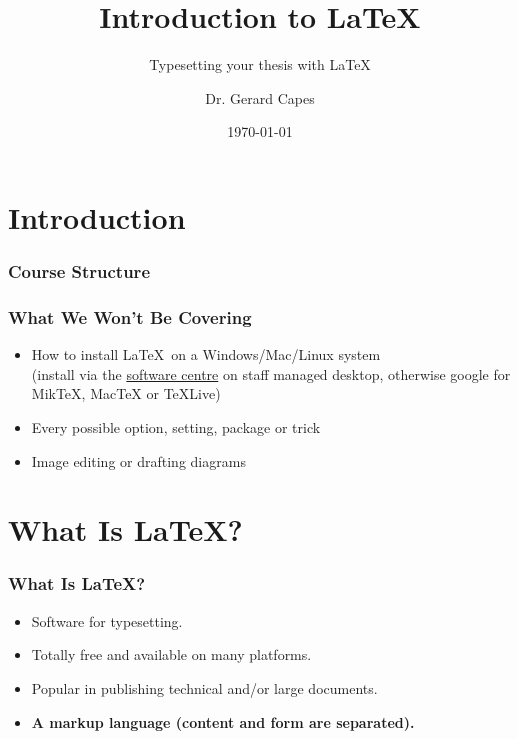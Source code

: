 \documentclass{beamer}
\title{Introduction to \LaTeX}
\subtitle{Typesetting your thesis with \LaTeX}
\author{Dr. Gerard Capes}
\institute{Research IT\\University of Manchester}
\date{\today{}}
\begin{document}
\begin{frame}
	\titlepage
\end{frame}

\section{Introduction}

\begin{frame}
	\frametitle{Course Structure}
	\tableofcontents
\end{frame}

\begin{frame} \frametitle{What We \textbf{Won't} Be Covering}
	\begin{itemize}
		\item How to install \LaTeX \ on a Windows/Mac/Linux system\\
		(install via the \href{http://softwarecentre.itservices.manchester.ac.uk/}{software centre} on staff managed desktop, otherwise google for MikTeX, MacTeX or TeXLive)
		\item Every possible option, setting, package or trick
		\item Image editing or drafting diagrams
	\end{itemize}
\end{frame}

\section{What Is \LaTeX?}

\begin{frame} \frametitle{What Is \LaTeX?}
	\begin{itemize}
		\item Software for typesetting.
		\item Totally free and available on many platforms.
		\item Popular in publishing technical and/or large documents.
		\item \textbf{A markup language (content and form are separated).}
	\end{itemize}
\end{frame}
\end{document}
